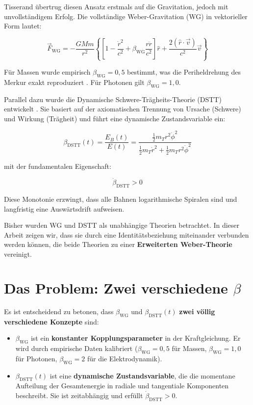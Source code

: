 \documentclass[12pt,a4paper]{article}
\begin{document}
Tisserand \cite{tisserand1882} übertrug diesen Ansatz erstmals auf die Gravitation, jedoch mit unvollständigem Erfolg. Die vollständige Weber-Gravitation (WG) in vektorieller Form lautet:

\begin{equation}
\vec{F}_{\text{WG}} = -\frac{GMm}{r^2} \left\{ \left[1 - \frac{\dot{r}^2}{c^2} + \beta_{\text{WG}}\frac{r\ddot{r}}{c^2}\right] \hat{r} + \frac{2(\hat{r}\cdot\vec{v})}{c^2}\vec{v} \right\}
\end{equation}

Für Massen wurde empirisch \(\beta_{\text{WG}} = 0,5\) bestimmt, was die Periheldrehung des Merkur exakt reproduziert \cite{einstein1915}. Für Photonen gilt \(\beta_{\text{WG}} = 1,0\).

Parallel dazu wurde die Dynamische Schwere-Trägheits-Theorie (DSTT) entwickelt \cite{czybor2025}. Sie basiert auf der axiomatischen Trennung von Ursache (Schwere) und Wirkung (Trägheit) und führt eine dynamische Zustandsvariable ein:

\begin{equation}
\beta_{\text{DSTT}}(t) = \frac{E_B(t)}{E(t)} = \frac{\frac{1}{2}m_T r^2\dot{\phi}^2}{\frac{1}{2}m_T\dot{r}^2 + \frac{1}{2}m_T r^2\dot{\phi}^2}
\end{equation}

mit der fundamentalen Eigenschaft:

\begin{equation}
\dot{\beta}_{\text{DSTT}} > 0
\end{equation}

Diese Monotonie erzwingt, dass alle Bahnen logarithmische Spiralen sind und langfristig eine Auswärtsdrift aufweisen.

Bisher wurden WG und DSTT als unabhängige Theorien betrachtet. In dieser Arbeit zeigen wir, dass sie durch eine Identitätsbeziehung miteinander verbunden werden können, die beide Theorien zu einer \textbf{Erweiterten Weber-Theorie} vereinigt.

\section{Das Problem: Zwei verschiedene \(\beta\)}

Es ist entscheidend zu betonen, dass \(\beta_{\text{WG}}\) und \(\beta_{\text{DSTT}}(t)\) \textbf{zwei völlig verschiedene Konzepte} sind:

\begin{itemize}
    \item \(\beta_{\text{WG}}\) ist ein \textbf{konstanter Kopplungsparameter} in der Kraftgleichung. Er wird durch empirische Daten kalibriert (\(\beta_{\text{WG}} = 0,5\) für Massen, \(\beta_{\text{WG}} = 1,0\) für Photonen, \(\beta_{\text{WG}} = 2\) für die Elektrodynamik).
    \item \(\beta_{\text{DSTT}}(t)\) ist eine \textbf{dynamische Zustandsvariable}, die die momentane Aufteilung der Gesamtenergie in radiale und tangentiale Komponenten beschreibt. Sie ist zeitabhängig und erfüllt \(\dot{\beta}_{\text{DSTT}} > 0\).
\end{itemize}
\end{document}
